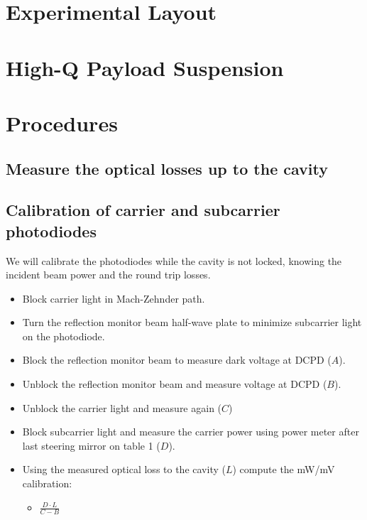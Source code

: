 
\section{Experimental Layout}

\section{High-Q Payload Suspension}

\section{Procedures}

\subsection{Measure the optical losses up to the cavity}

\subsection{Calibration of carrier and subcarrier photodiodes}
We will calibrate the photodiodes while the cavity is not locked, knowing the incident beam power and the round trip losses.

\begin{itemize}
    \item Block carrier light in Mach-Zehnder path.
    \item Turn the reflection monitor beam half-wave plate to minimize subcarrier light on the photodiode.
    \item Block the reflection monitor beam to measure dark voltage at DCPD ($A$).
    \item Unblock the reflection monitor beam and measure voltage at DCPD ($B$).
    \item Unblock the carrier light and measure again ($C$)
    \item Block subcarrier light and measure the carrier power using power meter after last steering mirror on table 1 ($D$).
    \item Using the measured optical loss to the cavity ($L$) compute the mW/mV calibration:
    \begin{itemize}
        \item $\frac{D\cdot L}{C - B}$
    \end{itemize}
\end{itemize}


